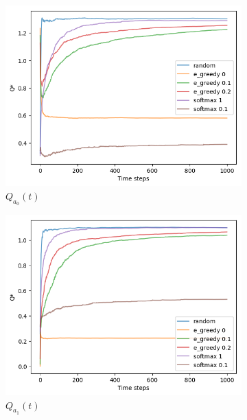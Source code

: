 \documentclass[letterpaper]{article}
\begin{document}
\begin{figure}[H]
  \begin{subfigure}{.5\textwidth}
    \centering
    \includegraphics[width=1\linewidth]{images/assign3/ex2/qta_0}
    \caption{$Q_{a_{0}}(t)$}
    \label{fig:qta_0_ex2}
  \end{subfigure}
  \begin{subfigure}{.5\textwidth}
    \centering
    \includegraphics[width=1\linewidth]{images/assign3/ex2/qta_1}
    \caption{$Q_{a_{1}}(t)$}
    \label{fig:qta_1_ex2}
  \end{subfigure}
  \begin{subfigure}{.5\textwidth}
    \centering

\end{subfigure}
\end{figure}
\end{document}
